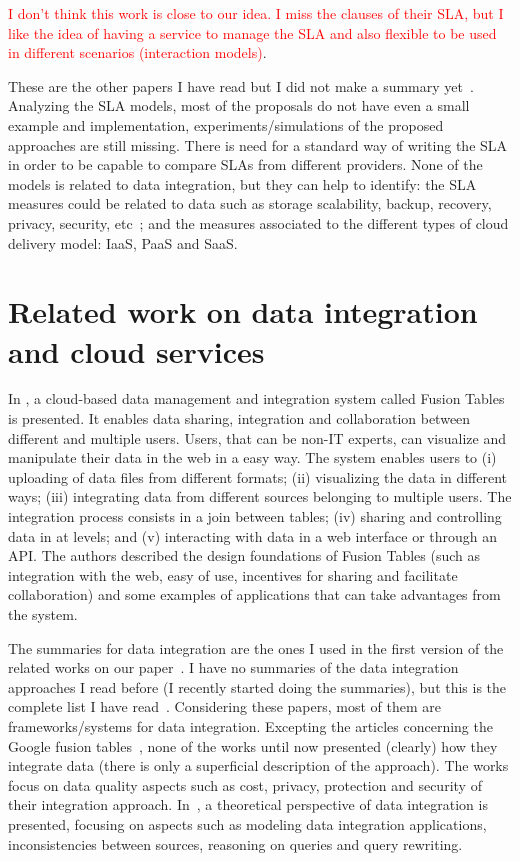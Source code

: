 \documentclass[12pt,a4paper,oneside]{article}
\begin{document}
\textcolor{red}{I don't think this work is close to our idea. I miss the clauses of their SLA, but I like the idea of having a service to manage the SLA and also flexible to be used in different scenarios (interaction models)}.

\bigskip These are the other papers I have read but I did not make a summary yet~\cite{BernsmedJU11,025}.
Analyzing the SLA models, most of the proposals do not have even a small example and implementation, experiments/simulations of the proposed approaches are still missing. There is need for a standard way of writing the SLA in order to be capable to compare SLAs from different providers. None of the models is related to data integration, but they can help to identify: the SLA measures could be related to data such as storage scalability, backup, recovery, privacy, security, etc~\cite{005}; and the measures associated to the different types of cloud delivery model: IaaS, PaaS and SaaS.




\section{Related work on data integration and cloud services}

In \cite{Gonzalez:2010b}, a cloud-based data management and integration system called Fusion Tables is presented. It enables data sharing, integration and collaboration between different and multiple users. Users, that can be non-IT experts, can visualize and manipulate their data in the web in a easy way. The system enables users to (i) uploading of data files from different formats; (ii) visualizing the data in different ways; (iii) integrating data from different sources belonging to multiple users. The integration process consists in a join between tables; (iv) sharing and controlling data in at levels; and (v) interacting with data in a web interface or through an API. The authors described the design foundations of Fusion Tables (such as integration with the web, easy of use, incentives for sharing and facilitate collaboration) and some examples of applications that can take advantages from the system. 

The summaries for data integration are the ones I used in the first version of the related works on our paper~\cite{075,078,Nie07,096,Yau08}. I have no summaries of the data integration approaches I read before (I recently started doing the summaries), but this is the complete list I have read~\cite{066,067,070,072,113,077,Dustdar:2012,081,110,111,094,099,102}. Considering these papers, most of them are frameworks/systems for data integration. Excepting the articles concerning the Google fusion tables~\cite{Gonzalez:2010}, none of the works until now presented (clearly) how they integrate data (there is only a superficial description of the approach). The works focus on data quality aspects such as cost, privacy, protection and security of their integration approach. In~\cite{Lenzerini:2002}, a theoretical perspective of data integration is presented, focusing on aspects such as modeling data integration applications, inconsistencies between sources, reasoning on queries and query rewriting.



\end{document}
